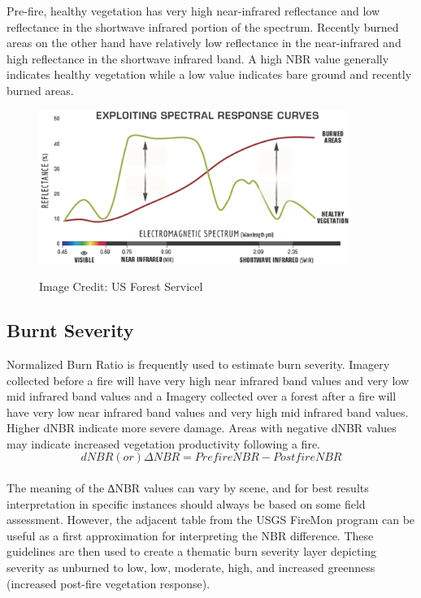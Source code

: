 \documentclass[12pt]{svproc}
\begin{document}
 Pre-fire, healthy vegetation has very high near-infrared reflectance and low reflectance in the shortwave infrared portion of the spectrum. Recently burned areas on the other hand have relatively low reflectance in the near-infrared and high reflectance in the shortwave infrared band. A high NBR value generally indicates healthy vegetation while a low value indicates bare ground and recently burned areas.\\
 
 	\begin{figure}{}
 		\includegraphics[width=0.9\linewidth, height=5cm]{p1.png} 
 		\label{fig:subim1}
 		\centering
 		 	\caption{Image Credit: US Forest Servicel}
 	\end{figure}
 
 \subsection{Burnt Severity}
Normalized Burn Ratio is frequently used to estimate burn severity. Imagery collected before a fire will have very high near infrared band values and very low mid infrared band values and a Imagery collected over a forest after a fire will have very low near infrared band values and very high mid infrared band values. Higher dNBR indicate more severe damage. Areas with negative dNBR values may indicate increased vegetation productivity following a fire.\\
 
 \begin{equation}
dNBR (or) \Delta NBR  = PrefireNBR - PostfireNBR
\end{equation}	\\


The meaning of the ∆NBR values can vary by scene, and for best results interpretation in specific instances should always be based on some field assessment. However, the adjacent table from the USGS FireMon program can be useful as a first approximation for interpreting the NBR difference. These guidelines are then used to create a thematic burn severity layer depicting severity as unburned to low, low, moderate, high, and increased greenness (increased post-fire vegetation response).\\
\end{document}
